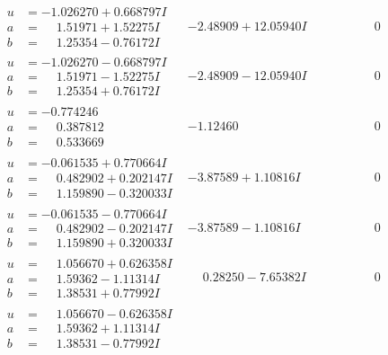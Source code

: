 \documentclass[1p]{elsarticle_modified}
\theoremstyle{definition}
\begin{document}
$$\begin{array}{c|c|c}
\begin{aligned}
u &= -1.026270 + 0.668797 I \\
a &= \phantom{-}1.51971 + 1.52275 I \\
b &= \phantom{-}1.25354 - 0.76172 I\end{aligned}
 & -2.48909 + 12.05940 I & \phantom{-0.000000 } 0 \\ \hline\begin{aligned}
u &= -1.026270 - 0.668797 I \\
a &= \phantom{-}1.51971 - 1.52275 I \\
b &= \phantom{-}1.25354 + 0.76172 I\end{aligned}
 & -2.48909 - 12.05940 I & \phantom{-0.000000 } 0 \\ \hline\begin{aligned}
u &= -0.774246\phantom{ +0.000000I} \\
a &= \phantom{-}0.387812\phantom{ +0.000000I} \\
b &= \phantom{-}0.533669\phantom{ +0.000000I}\end{aligned}
 & -1.12460\phantom{ +0.000000I} & \phantom{-0.000000 } 0 \\ \hline\begin{aligned}
u &= -0.061535 + 0.770664 I \\
a &= \phantom{-}0.482902 + 0.202147 I \\
b &= \phantom{-}1.159890 - 0.320033 I\end{aligned}
 & -3.87589 + 1.10816 I & \phantom{-0.000000 } 0 \\ \hline\begin{aligned}
u &= -0.061535 - 0.770664 I \\
a &= \phantom{-}0.482902 - 0.202147 I \\
b &= \phantom{-}1.159890 + 0.320033 I\end{aligned}
 & -3.87589 - 1.10816 I & \phantom{-0.000000 } 0 \\ \hline\begin{aligned}
u &= \phantom{-}1.056670 + 0.626358 I \\
a &= \phantom{-}1.59362 - 1.11314 I \\
b &= \phantom{-}1.38531 + 0.77992 I\end{aligned}
 & \phantom{-}0.28250 - 7.65382 I & \phantom{-0.000000 } 0 \\ \hline\begin{aligned}
u &= \phantom{-}1.056670 - 0.626358 I \\
a &= \phantom{-}1.59362 + 1.11314 I \\
b &= \phantom{-}1.38531 - 0.77992 I\end{aligned}

\end{array}$$
\end{document}
